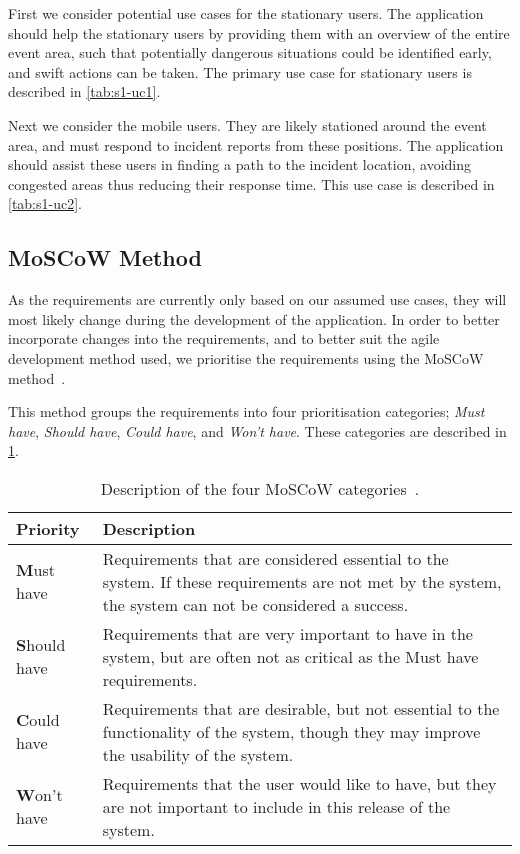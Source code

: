First we consider potential use cases for the stationary users. The application should help the stationary users by providing them with an overview of the entire event area, such that potentially dangerous situations could be identified early, and swift actions can be taken. The primary use case for stationary users is described in \cref{tab:s1-uc1}.



Next we consider the mobile users. They are likely stationed around the event area, and must respond to incident reports from these positions. The application should assist these users in finding a path to the incident location, avoiding congested areas thus reducing their response time. This use case is described in \cref{tab:s1-uc2}.



\subsection{MoSCoW Method} \label{ss:s1_moscow}
As the requirements are currently only based on our assumed use cases, they will most likely change during the development of the application. In order to better incorporate changes into the requirements, and to better suit the agile development method used, we prioritise the requirements using the MoSCoW method~\cite{moscow}.

This method groups the requirements into four prioritisation categories; \emph{Must have}, \emph{Should have}, \emph{Could have}, and \emph{Won't have}. These categories are described in \cref{tab:moscow}.

\begin{table}[htbp]
	\centering
	\begin{tabularx}{\textwidth}{lX}
		\toprule
		\textbf{Priority} & \textbf{Description} \\
		\midrule
		\rowcolor[HTML]{EFEFEF} 
		\textbf{M}ust have & Requirements that are considered essential to the system. If these requirements are not met by the system, the system can not be considered a success. \\
		\textbf{S}hould have & Requirements that are very important to have in the system, but are often not as critical as the Must have requirements. \\
		\rowcolor[HTML]{EFEFEF} 
		\textbf{C}ould have & Requirements that are desirable, but not essential to the functionality of the system, though they may improve the usability of the system. \\
		\textbf{W}on't have & Requirements that the user would like to have, but they are not important to include in this release of the system. \\
		\bottomrule
	\end{tabularx}
	\caption{Description of the four MoSCoW categories~\cite{moscow}.}
	\label{tab:moscow}
\end{table}

